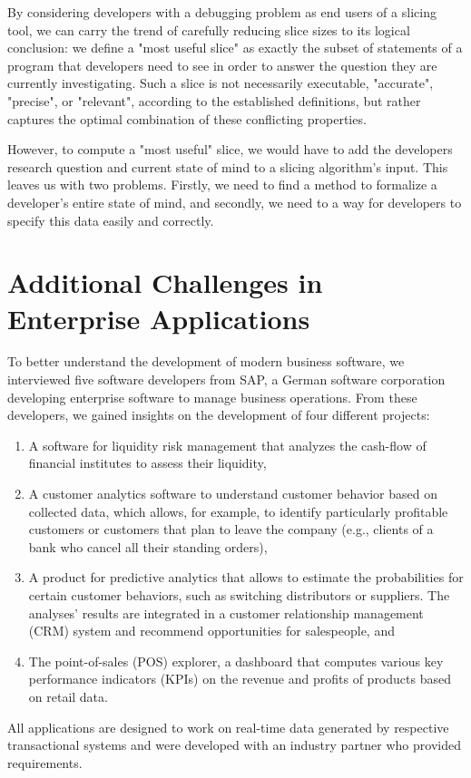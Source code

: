 By considering developers with a debugging problem as end users of a slicing tool, we can carry the trend of carefully reducing slice sizes to its logical conclusion: we define a "most useful slice" as exactly the subset of statements of a program that developers need to see in order to answer the question they are currently investigating.
Such a slice is not necessarily executable, "accurate", "precise", or "relevant", according to the established definitions, but rather captures the optimal combination of these conflicting properties.

However, to compute a "most useful" slice, we would have to add the developers research question and current state of mind to a slicing algorithm's input.
This leaves us with two problems.
Firstly, we need to find a method to formalize a developer's entire state of mind, and secondly, we need to a way for developers to specify this data easily and correctly.

\section{Additional Challenges in Enterprise Applications}

\tmpStart
To better understand the development of modern business software, we interviewed five software developers from SAP, a German software corporation developing enterprise software to manage business operations.
From these developers, we gained insights on the development of four different projects:
\begin{enumerate}
	\item A software for liquidity risk management that analyzes the cash-flow of financial institutes to assess their liquidity,
	\item A customer analytics software to understand customer behavior based on collected data, which allows, for example, to identify particularly profitable customers or customers that plan to leave the company (e.g., clients of a bank who cancel all their standing orders),
	\item A product for predictive analytics that allows to estimate the probabilities for certain customer behaviors, such as switching distributors or suppliers. The analyses' results are integrated in a customer relationship management (CRM) system and recommend opportunities for salespeople, and
	\item The point-of-sales (POS) explorer, a dashboard that computes various key performance indicators (KPIs) on the revenue and profits of products based on retail data.
\end{enumerate}
%
All applications are designed to work on real-time data generated by respective transactional systems and were developed with an industry partner who provided requirements.

